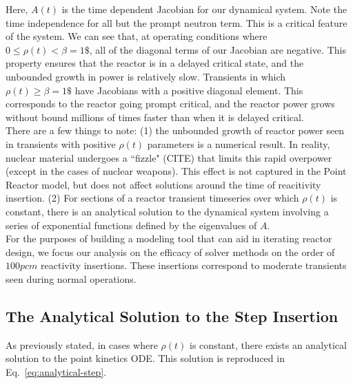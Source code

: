 \documentclass[review,onefignum,onetabnum]{siamart171218}
\begin{document}
Here, $A(t)$ is the time dependent Jacobian for our dynamical system. Note the
time independence for all but the prompt neutron term. This is a critical feature
of the system. We can see that, at operating conditions where $0 \leq \rho(t) < \beta = 1\$$,
all of the diagonal terms of our Jacobian are negative. This property ensures
that the reactor is in a delayed critical state, and the unbounded growth in power
is relatively slow. Transients in which $\rho(t) \geq \beta = 1\$$ have Jacobians with
a positive diagonal element. This corresponds to the reactor going prompt critical, and
the reactor power grows without bound millions of times faster than when it is delayed
critical. \\

There are a few things to note: (1) the unbounded growth of reactor power seen
in transients with positive $\rho(t)$ parameters is a numerical result. In reality,
nuclear material undergoes a ``fizzle" (CITE) that limits this rapid overpower (except
in the cases of nuclear weapons). This effect is not captured in the Point Reactor
model, but does not affect solutions around the time of reacitivity insertion. (2) For
sections of a reactor transient timeseries over which $\rho(t)$ is constant, there is an
analytical solution to the dynamical system involving a series of exponential functions
defined by the eigenvalues of $A$. \\

For the purposes of building a modeling tool that can aid in iterating reactor design,
we focus our analysis on the efficacy of solver methods on the order of $100 pcm$
reactivity insertions. These insertions correspond to moderate transients seen during
normal operations.

\subsection{The Analytical Solution to the Step Insertion}
As previously stated, in cases where $\rho(t)$ is constant, there exists an
analytical solution to the point kinetics ODE. This solution is reproduced in
Eq.~\cref{eq:analytical-step}.

%
\end{document}
